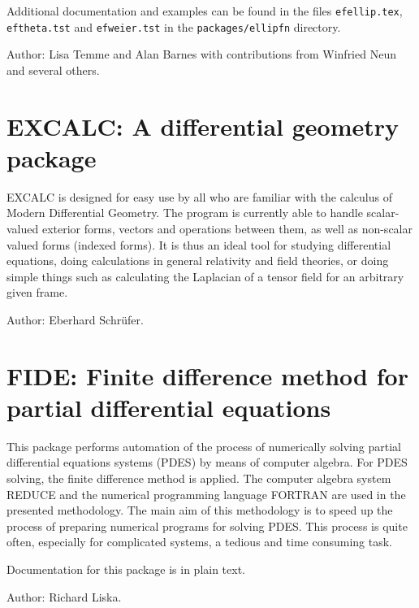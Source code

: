 Additional documentation and examples can
be found in the files \texttt{efellip.tex}, \texttt{eftheta.tst} and
\texttt{efweier.tst} in the \texttt{packages/ellipfn} directory.

Author:  Lisa Temme and Alan Barnes with contributions from Winfried Neun
and several others.



\newpage

\section{EXCALC: A differential geometry package}
\label{package:EXCALC}

EXCALC is designed for easy use by all who are familiar with the calculus
of Modern Differential Geometry. The program is currently able to handle
scalar-valued exterior forms, vectors and operations between them, as well
as non-scalar valued forms (indexed forms). It is thus an ideal tool for
studying differential equations, doing calculations in general relativity
and field theories, or doing simple things such as calculating the
Laplacian of a tensor field for an arbitrary given frame.

Author: Eberhard Schr\"ufer.



\newpage

\section{FIDE: Finite difference method for partial differential equations}

This package performs  automation of  the process of numerically
solving  partial  differential  equations  systems  (PDES)  by  means of
computer algebra.  For PDES solving, the finite difference method is applied.
The  computer  algebra  system  REDUCE  and  the  numerical  programming
language FORTRAN  are used in the presented methodology. The main aim of
this methodology is to speed up the process of preparing numerical
programs for  solving PDES.  This process is quite often, especially for
complicated systems, a tedious and time consuming task.

Documentation for this package is in plain text.

Author: Richard Liska.



\newpage



